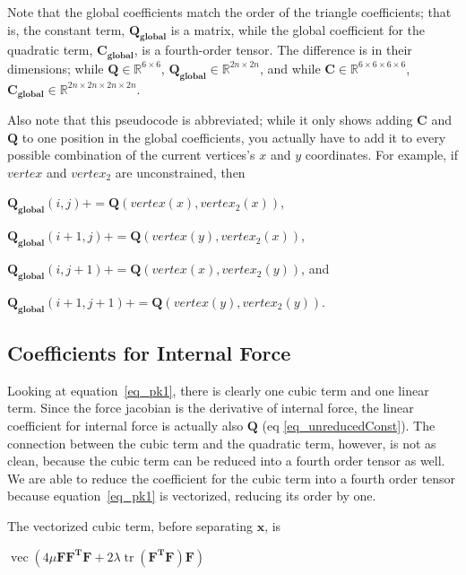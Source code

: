 \documentclass[twocolumn,10pt]{asme2ej}
\DeclareMathOperator{\vect}{vec}
\DeclareMathOperator{\tr}{tr}
\begin{document}
Note that the global coefficients match the order of the triangle coefficients; that is, the constant term, $\bm{Q_{global}}$ is a matrix, while the global coefficient for the quadratic term, $\bm{C_{global}}$, is a fourth-order tensor. The difference is in their dimensions; while $\bm{Q} \in \mathbb{R}^{6 \times 6}$, $\bm{Q_{global}} \in \mathbb{R}^{2n \times 2n}$, and while  $\bm{C} \in \mathbb{R}^{6 \times 6 \times 6 \times 6}$, $\bm{C_{global}} \in \mathbb{R}^{2n \times 2n \times 2n \times 2n}$.

Also note that this pseudocode is abbreviated; while it only shows adding $\bm{C}$ and $\bm{Q}$ to one position in the global coefficients, you actually have to add it to every possible combination of the current vertices's $x$ and $y$ coordinates. For example, if $vertex$ and $vertex_2$ are unconstrained, then

\begin{center}
$\bm{Q_{global}}(i,j) += \bm{Q}(vertex(x), vertex_2(x))$,

$\bm{Q_{global}}(i + 1,j) += \bm{Q}(vertex(y), vertex_2(x))$,

$\bm{Q_{global}}(i ,j + 1) += \bm{Q}(vertex(x), vertex_2(y))$, and

$\bm{Q_{global}}(i + 1,j + 1) += \bm{Q}(vertex(y), vertex_2(y))$.
\end{center}

\subsection{Coefficients for Internal Force}

Looking at equation~\ref{eq_pk1}, there is clearly one cubic term and one linear term. Since the force jacobian is the derivative of internal force, the linear coefficient for internal force is actually also $\bm{Q}$ (eq \ref{eq_unreducedConst}). The connection between the cubic term and the quadratic term, however, is not as clean, because the cubic term can be reduced into a fourth order tensor as well. We are able to reduce the coefficient for the cubic term into a fourth order tensor because equation~\ref{eq_pk1} is vectorized, reducing its order by one.

The vectorized cubic term, before separating $\bm{x}$, is

\begin{center}
  $\vect \left( 4\mu\bm{FF^TF} + 2\lambda\tr\left(\bm{F^TF}\right)\bm{F}\right)$
\end{center}
\end{document}
